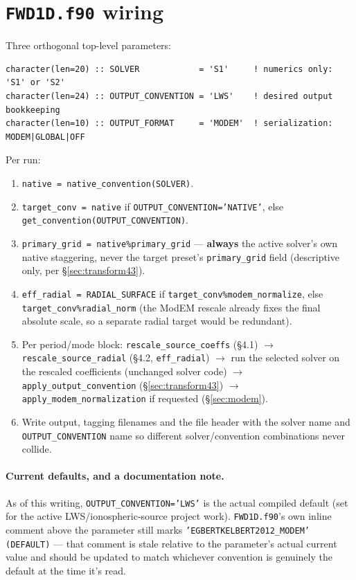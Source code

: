 \documentclass[11pt]{article}
\begin{document}
\section{\texttt{FWD1D.f90} wiring}
\label{sec:fwd1d}

Three orthogonal top-level parameters:

\begin{verbatim}
character(len=20) :: SOLVER            = 'S1'     ! numerics only: 'S1' or 'S2'
character(len=24) :: OUTPUT_CONVENTION = 'LWS'    ! desired output bookkeeping
character(len=10) :: OUTPUT_FORMAT     = 'MODEM'  ! serialization: MODEM|GLOBAL|OFF
\end{verbatim}

Per run:
\begin{enumerate}
\item \texttt{native = native\_convention(SOLVER)}.
\item \texttt{target\_conv = native} if \texttt{OUTPUT\_CONVENTION='NATIVE'}, else
\texttt{get\_convention(OUTPUT\_CONVENTION)}.
\item \texttt{primary\_grid = native\%primary\_grid} --- \textbf{always} the active solver's own
native staggering, never the target preset's \texttt{primary\_grid} field (descriptive only, per
\S\ref{sec:transform43}).
\item \texttt{eff\_radial = RADIAL\_SURFACE} if \texttt{target\_conv\%modem\_normalize}, else
\texttt{target\_conv\%radial\_norm} (the ModEM rescale already fixes the final absolute scale, so
a separate radial target would be redundant).
\item Per period/mode block: \texttt{rescale\_source\_coeffs} (\S4.1) $\to$
\texttt{rescale\_source\_radial} (\S4.2, \texttt{eff\_radial}) $\to$ run the selected solver on the
rescaled coefficients (unchanged solver code) $\to$ \texttt{apply\_output\_convention}
(\S\ref{sec:transform43}) $\to$ \texttt{apply\_modem\_normalization} if requested (\S\ref{sec:modem}).
\item Write output, tagging filenames and the file header with the solver name and
\texttt{OUTPUT\_CONVENTION} name so different solver/convention combinations never collide.
\end{enumerate}

\paragraph{Current defaults, and a documentation note.} As of this writing,
\texttt{OUTPUT\_CONVENTION='LWS'} is the actual compiled default (set for the active
LWS/ionospheric-source project work). \texttt{FWD1D.f90}'s own inline comment above the parameter
still marks \texttt{'EGBERTKELBERT2012\_MODEM' (DEFAULT)} --- that comment is stale relative to the
parameter's actual current value and should be updated to match whichever convention is genuinely
the default at the time it's read.
\end{document}
